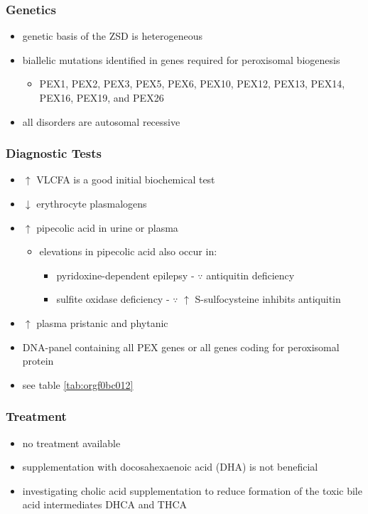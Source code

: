 \documentclass[12pt]{scrartcl}
\begin{document}
\subsubsection{Genetics}
\label{sec:org963c841}
\begin{itemize}
\item genetic basis of the ZSD is heterogeneous
\item biallelic mutations identified in genes required for peroxisomal biogenesis
\begin{itemize}
\item PEX1, PEX2, PEX3, PEX5, PEX6, PEX10, PEX12, PEX13, PEX14, PEX16, PEX19, and PEX26
\end{itemize}
\item all disorders are autosomal recessive
\end{itemize}

\subsubsection{Diagnostic Tests}
\label{sec:orgabbb51b}
\begin{itemize}
\item \(\uparrow\) VLCFA is a good initial biochemical test
\item \(\downarrow\) erythrocyte plasmalogens
\item \(\uparrow\) pipecolic acid in urine or plasma
\begin{itemize}
\item elevations in pipecolic acid also occur in:
\begin{itemize}
\item pyridoxine-dependent epilepsy - \(\because\) antiquitin deficiency
\item sulfite oxidase deficiency - \(\because\) \(\uparrow\) S-sulfocysteine inhibits antiquitin
\end{itemize}
\end{itemize}
\item \(\uparrow\) plasma pristanic and phytanic
\item DNA-panel containing all PEX genes or all genes coding for
peroxisomal protein
\item see table \ref{tab:orgf0bc012}
\end{itemize}
\subsubsection{Treatment}
\label{sec:orgd994fa8}
\begin{itemize}
\item no treatment available
\item supplementation with docosahexaenoic acid (DHA) is not beneficial
\item investigating cholic acid supplementation to reduce formation of the
toxic bile acid intermediates DHCA and THCA
\end{itemize}
\end{document}
